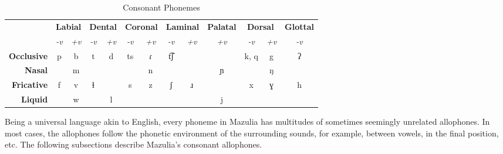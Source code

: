 \begin{table}[h]
\caption{Consonant Phonemes}
\label{tab:3-consonant-phonemes}
\begin{tabular}{|r|cc|cc|cc|cc|c|cc|c|}
\hline
\multicolumn{1}{|c|}{\textbf{}} & \multicolumn{2}{c|}{\textbf{Labial}}           & \multicolumn{2}{c|}{\textbf{Dental}}           & \multicolumn{2}{c|}{\textbf{Coronal}}          & \multicolumn{2}{c|}{\textbf{Laminal}}          & \textbf{Palatal} & \multicolumn{2}{c|}{\textbf{Dorsal}}           & \textbf{Glottal} \\ \cline{2-13} 
\multicolumn{1}{|c|}{\textbf{}} & \multicolumn{1}{c|}{\textit{-v}} & \textit{+v} & \multicolumn{1}{c|}{\textit{-v}} & \textit{+v} & \multicolumn{1}{c|}{\textit{-v}} & \textit{+v} & \multicolumn{1}{c|}{\textit{-v}} & \textit{+v} & \textit{+v}      & \multicolumn{1}{c|}{\textit{-v}} & \textit{+v} & \textit{-v}      \\ \hline
\textbf{Occlusive}              & \multicolumn{1}{c|}{p}           & b           & \multicolumn{1}{c|}{t}           & d           & \multicolumn{1}{c|}{ts}          & ɾ           & \multicolumn{1}{c|}{t͡ʃ}         &             &                  & \multicolumn{1}{c|}{k, q}        & g           & ʔ                \\ \hline
\textbf{Nasal}                  & \multicolumn{1}{c|}{}            & m           & \multicolumn{1}{c|}{}            &             & \multicolumn{1}{c|}{}            & n           & \multicolumn{1}{c|}{}            &             & ɲ                & \multicolumn{1}{c|}{}            & ŋ           &                  \\ \hline
\textbf{Fricative}              & \multicolumn{1}{c|}{f}           & v           & \multicolumn{1}{c|}{ɬ}           &             & \multicolumn{1}{c|}{s}           & z           & \multicolumn{1}{c|}{ʃ}           & ɹ           &                  & \multicolumn{1}{c|}{x}           & ɣ           & h                \\ \hline
\textbf{Liquid}            & \multicolumn{1}{c|}{}            & w           & \multicolumn{1}{c|}{}            & l           & \multicolumn{1}{c|}{}            &             & \multicolumn{1}{c|}{}            &             & j                & \multicolumn{1}{c|}{}            &             &                  \\ \hline
\end{tabular}
\end{table}

Being a universal language akin to English, every phoneme in Mazulia has multitudes of sometimes seemingly unrelated allophones. In most cases, the allophones follow the phonetic environment of the surrounding sounds, for example, between vowels, in the final position, etc. The following subsections describe Mazulia's consonant allophones.

